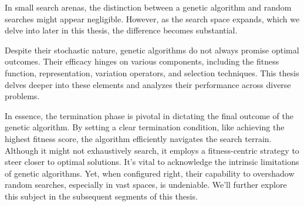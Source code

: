   In small search arenas, the distinction between a genetic algorithm and 
  random searches might appear negligible.
  However, as the search space expands, which we delve into later in this 
  thesis, the difference becomes substantial.

  Despite their stochastic nature, genetic algorithms do not always promise 
  optimal outcomes.
  Their efficacy hinges on various components, including the fitness function, 
  representation, variation operators, and selection techniques.
  This thesis delves deeper into these elements and analyzes their performance 
  across diverse problems.

  In essence, the termination phase is pivotal in dictating the final outcome 
  of the genetic algorithm.
  By setting a clear termination condition, like achieving the highest fitness 
  score, the algorithm efficiently navigates the search terrain.
  Although it might not exhaustively search, it employs a fitness-centric 
  strategy to steer closer to optimal solutions.
  It's vital to acknowledge the intrinsic limitations of genetic algorithms. 
  Yet, when configured right, their capability to overshadow random searches, 
  especially in vast spaces, is undeniable.
  We'll further explore this subject in the subsequent segments of this thesis.
